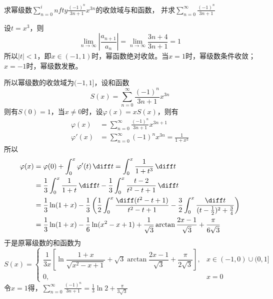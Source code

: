 \begin{example}
    求幂级数$\displaystyle\sum_{n=0}^infty \frac{(-1)^n}{3n+1}x^{3n}$的收敛域与和函数，
    并求$\displaystyle\sum_{n=0}^\infty\frac{(-1)^n}{3n+1}$
\end{example}
\begin{solution}
    设$t=x^3$，则
    \[
        \lim_{n\to\infty} \left|\frac{a_{n+1}}{a_n}\right|
        =
        \lim_{n\to\infty} \frac{3n+4}{3n+1}
        =
        1
    \]
    所以$|t|<1$，即$x\in(-1,1)$时，幂函数绝对收敛。当$x=1$时，幂级数条件收敛；$x=-1$时，幂级数发散。

    所以幂级数的收敛域为$(-1,1]$，设和函数
    \[ S(x) = \sum_{n=0}^\infty \frac{(-1)^n}{3n+1}x^{3n} \]
    则有$S(0)=1$，当$x\neq 0$时，设$\varphi(x) = xS(x)$，则有
    \begin{align*}
        \varphi(x)  & = \sum_{n=0}^\infty \frac{(-1)^n}{3n+1}x^{3n+1}     \\
        \varphi'(x) & = \sum_{n=0}^\infty (-1)^n x^{3n} = \frac{1}{1+x^3}
    \end{align*}
    所以
    \begin{align*}
        \varphi(x)
         & = \varphi(0) + \int_0^x \varphi'(t)\,\diff t = \int_0^x \frac{1}{1+t^3}\,\diff t                                                                                             \\
         & = \frac{1}{3}\int_0^x \frac{1}{1+t}\,\diff t - \frac{1}{3}\int_0^x \frac{t-2}{t^2-t+1}\,\diff t                                                                              \\
         & = \frac{1}{3}\ln(1+x) - \frac{1}{3}\left( \frac{1}{2}\int_0^x \frac{\diff (t^2-t+1)}{t^2-t+1} - \frac{3}{2}\int_0^x \frac{\diff t}{(t-\frac{1}{2})^2 + \frac{3}{4}}  \right) \\
         & = \frac{1}{3}\ln(1+x) - \frac{1}{6}\ln(x^2-x+1) + \frac{1}{\sqrt{3}}\arctan\frac{2x-1}{\sqrt{3}} +\frac{\pi}{6\sqrt{3}}
    \end{align*}
    于是原幂级数的和函数为
    \[
        S(x) =
        \begin{cases}
            \dfrac{1}{3x}\left[\ln\dfrac{1+x}{\sqrt{x^2-x+1}}+ \sqrt{3}\arctan\dfrac{2x-1}{\sqrt{3}} + \dfrac{\pi}{2\sqrt{3}}\right], & x\in(-1,0)\cup(0,1] \\
            0,                                                                                                                        & x=0
        \end{cases}
    \]
    令$x=1$得，$\displaystyle\sum_{n=0}^\infty\frac{(-1)^n}{3n+1} = \frac{1}{3}\ln 2 + \frac{\pi}{3\sqrt{3}}$
\end{solution}

